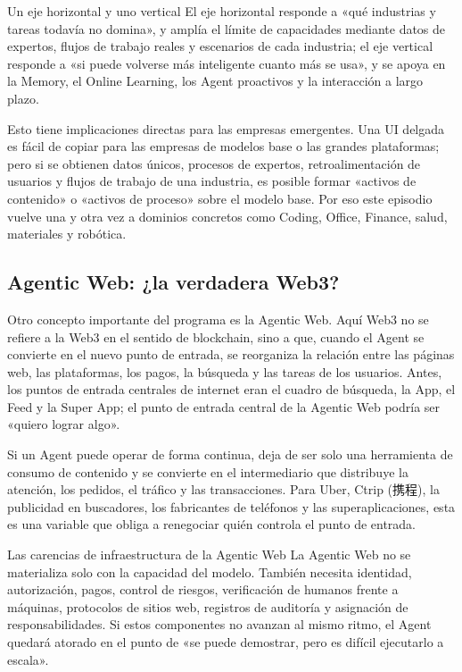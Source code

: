\begin{importantbox}{Un eje horizontal y uno vertical}
El eje horizontal responde a «qué industrias y tareas todavía no domina», y amplía el límite de capacidades mediante datos de expertos, flujos de trabajo reales y escenarios de cada industria; el eje vertical responde a «si puede volverse más inteligente cuanto más se usa», y se apoya en la Memory, el Online Learning, los Agent proactivos y la interacción a largo plazo.
\end{importantbox}

Esto tiene implicaciones directas para las empresas emergentes. Una UI delgada es fácil de copiar para las empresas de modelos base o las grandes plataformas; pero si se obtienen datos únicos, procesos de expertos, retroalimentación de usuarios y flujos de trabajo de una industria, es posible formar «activos de contenido» o «activos de proceso» sobre el modelo base. Por eso este episodio vuelve una y otra vez a dominios concretos como Coding, Office, Finance, salud, materiales y robótica.

\subsection{Agentic Web: ¿la verdadera Web3?}

Otro concepto importante del programa es la Agentic Web. Aquí Web3 no se refiere a la Web3 en el sentido de blockchain, sino a que, cuando el Agent se convierte en el nuevo punto de entrada, se reorganiza la relación entre las páginas web, las plataformas, los pagos, la búsqueda y las tareas de los usuarios. Antes, los puntos de entrada centrales de internet eran el cuadro de búsqueda, la App, el Feed y la Super App; el punto de entrada central de la Agentic Web podría ser «quiero lograr algo».

Si un Agent puede operar de forma continua, deja de ser solo una herramienta de consumo de contenido y se convierte en el intermediario que distribuye la atención, los pedidos, el tráfico y las transacciones. Para Uber, Ctrip (携程), la publicidad en buscadores, los fabricantes de teléfonos y las superaplicaciones, esta es una variable que obliga a renegociar quién controla el punto de entrada.

\begin{warningbox}{Las carencias de infraestructura de la Agentic Web}
La Agentic Web no se materializa solo con la capacidad del modelo. También necesita identidad, autorización, pagos, control de riesgos, verificación de humanos frente a máquinas, protocolos de sitios web, registros de auditoría y asignación de responsabilidades. Si estos componentes no avanzan al mismo ritmo, el Agent quedará atorado en el punto de «se puede demostrar, pero es difícil ejecutarlo a escala».
\end{warningbox}

